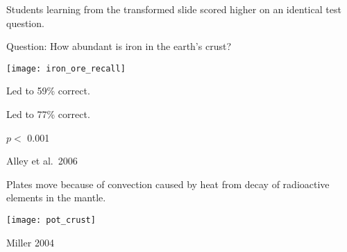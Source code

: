 \documentclass[t]{beamer}
\begin{document}
%

\begin{frame}[t]{Students learning from the transformed slide scored higher on an identical test question.}

\vspace{-\baselineskip}
\hangpara Question: How abundant is iron in the earth's crust?

\noindent \texttt{[image: iron\_ore\_recall]}

\vspace{-\baselineskip}
\begin{multicols}{2}
\centering

Led to 59\% correct. 

\columnbreak

Led to 77\% correct.
\end{multicols}

\hangpara $p < $ 0.001


\tinyfill Alley et al.\ 2006

\end{frame}

%
{
\begin{frame}[t]
\end{frame}
}

\begin{frame}[t]{Plates move because of convection caused by heat from decay of radioactive elements in the mantle.}

\vspace{-0.5\baselineskip}

\texttt{[image: pot\_crust]}


\vfilll

\tiny Miller 2004

\end{frame}

%
\end{document}
